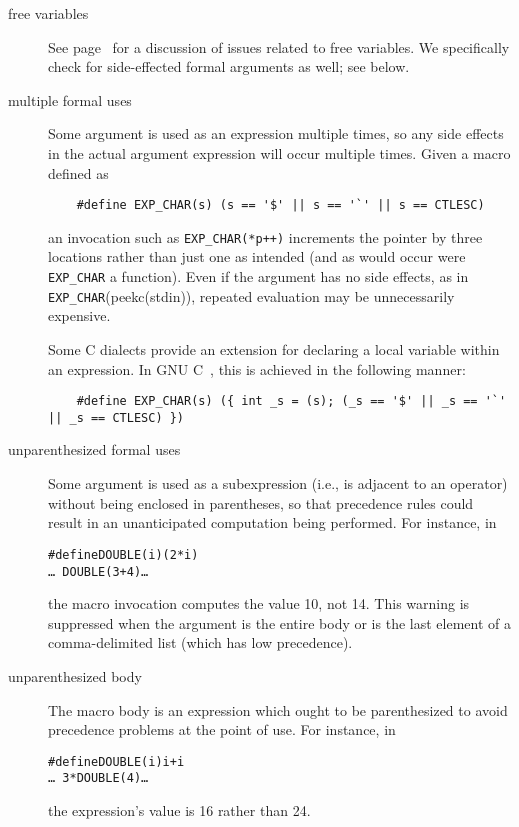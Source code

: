 
\begin{description}
\item[free variables]
  See page~\pageref{page:freevar} for a discussion of issues related to
  free variables.  We specifically check for side-effected formal arguments
  as well; see below.

\item[multiple formal uses]
        Some argument is used as an expression multiple times, so any side
        effects in the actual argument expression will occur multiple
        times.  
        Given a macro defined as
\begin{verbatim}
    #define EXP_CHAR(s) (s == '$' || s == '`' || s == CTLESC)
\end{verbatim}
        an invocation such as {\tt \verb|EXP_CHAR|(*p++)} increments the
        pointer by three locations rather than just one as intended (and as
        would occur were \verb|EXP_CHAR| a function).  Even if the argument
        has no side effects, as in \verb|EXP_CHAR|(peekc(stdin)), repeated
        evaluation may be unnecessarily expensive.
        
        Some C dialects provide an extension for declaring a local variable
        within an expression.  In GNU C~\cite{GCC}, this is achieved in the
        following manner:
\begin{verbatim}
    #define EXP_CHAR(s) ({ int _s = (s); (_s == '$' || _s == '`' || _s == CTLESC) })
\end{verbatim}

\item[unparenthesized formal uses]
        Some argument is used as a subexpression (i.e., is adjacent to an
        operator) without being enclosed in parentheses, so that precedence
        rules could result in an unanticipated computation being performed.
        For instance, in
\begin{alltt}
    #define DOUBLE(i) (2*i)
    \ldots\ DOUBLE(3+4) \ldots
\end{alltt}
        the macro invocation computes the value 10, not 14.
        This warning is suppressed when the argument is the entire body
        or is the last element of a comma-delimited list (which has 
        low precedence).

\item[unparenthesized body]
        The macro body is an expression which ought to be parenthesized to
        avoid precedence problems at the point of use.  For instance, in
\begin{alltt}
    #define DOUBLE(i) i+i
    \ldots\ 3*DOUBLE(4) \ldots
\end{alltt}
        the expression's value is 16 rather than 24.
        

\end{description}
